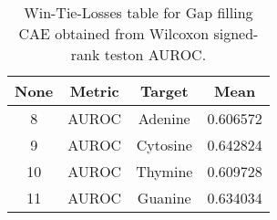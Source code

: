 \begin{table}[H]
\centering
\begin{tabular}{|c|c|c|c|}

 \textbf{None} & \textbf{Metric} & \textbf{Target} &  \textbf{Mean} \\
\hline

             8 &           AUROC &         Adenine &       0.606572 \\
\hline
             9 &           AUROC &        Cytosine &       0.642824 \\
\hline
            10 &           AUROC &         Thymine &       0.609728 \\
\hline
            11 &           AUROC &         Guanine &       0.634034 \\
\hline

\end{tabular}
\caption{Win-Tie-Losses table for Gap filling CAE obtained from Wilcoxon signed-rank teston AUROC.}
\label{tab:gap_filling_cae_nucleotides_means}
\end{table}